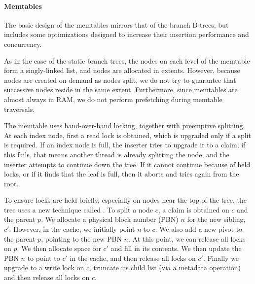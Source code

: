 \paragraph{Memtables}
The basic design of the memtables mirrors that of the branch B-trees, but
includes some optimizations designed to increase their insertion performance
and concurrency.

As in the case of the static branch trees, the nodes on each level of the
memtable form a singly-linked list, and nodes are allocated in extents.
However, because nodes are created on
demand as nodes split, we do not try to guarantee that successive nodes
reside in the same extent.  Furthermore, since memtables are almost always
in RAM, we do not perform prefetching during memtable traversals.


The memtable uses hand-over-hand locking, together with preemptive
splitting. At each index node, first a read lock is obtained, which is
upgraded only if a split is required. If an index node is full, the
inserter tries to upgrade it to a claim; if this fails, that means
another thread is already splitting the node, and the inserter
attempts to continue down the tree.  If it cannot continue because of
held locks, or if it finds that the leaf is full, then it aborts and
tries again from the root.

To ensure locks are held briefly, especially on nodes near the top of
the tree, the tree uses a new technique called . To split a node $c$, a claim is obtained on $c$ and the
parent $p$. We allocate a physical block number (PBN) $n$ for the new
sibling, $c'$.  However, in the cache, we initially point $n$ to $c$.
We also add a new pivot to the parent $p$, pointing to the new PBN
$n$.  At this point, we can release all locks on $p$.  We then
allocate space for $c'$ and fill in its contents.  We then update the
PBN $n$ to point to $c'$ in the cache, and then release all locks on
$c'$.  Finally we upgrade to a write lock on $c$, truncate its child
list (via a metadata operation) and then release all locks on $c$.

